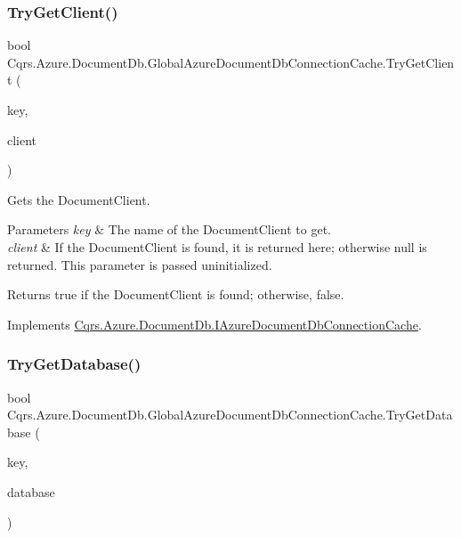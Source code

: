 \subsubsection{\texorpdfstring{Try\+Get\+Client()}{TryGetClient()}}
{\footnotesize\ttfamily bool Cqrs.\+Azure.\+Document\+Db.\+Global\+Azure\+Document\+Db\+Connection\+Cache.\+Try\+Get\+Client (\begin{DoxyParamCaption}\item[{string}]{key,  }\item[{out Document\+Client}]{client }\end{DoxyParamCaption})}



Gets the Document\+Client. 


\begin{DoxyParams}{Parameters}
{\em key} & The name of the Document\+Client to get.\\
\hline
{\em client} & If the Document\+Client is found, it is returned here; otherwise null is returned. This parameter is passed uninitialized.\\
\hline
\end{DoxyParams}
\begin{DoxyReturn}{Returns}
true if the Document\+Client is found; otherwise, false.
\end{DoxyReturn}


Implements \hyperlink{interfaceCqrs_1_1Azure_1_1DocumentDb_1_1IAzureDocumentDbConnectionCache_a56a01a4224cb64d9349913e5237cebda_a56a01a4224cb64d9349913e5237cebda}{Cqrs.\+Azure.\+Document\+Db.\+I\+Azure\+Document\+Db\+Connection\+Cache}.

\mbox{\label{classCqrs_1_1Azure_1_1DocumentDb_1_1GlobalAzureDocumentDbConnectionCache_afa1518eacc7e71308bfe3ef27631da45_afa1518eacc7e71308bfe3ef27631da45}} 
\subsubsection{\texorpdfstring{Try\+Get\+Database()}{TryGetDatabase()}}
{\footnotesize\ttfamily bool Cqrs.\+Azure.\+Document\+Db.\+Global\+Azure\+Document\+Db\+Connection\+Cache.\+Try\+Get\+Database (\begin{DoxyParamCaption}\item[{string}]{key,  }\item[{out Database}]{database }\end{DoxyParamCaption})}



